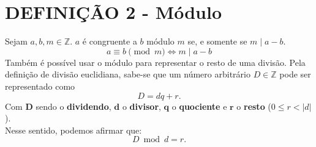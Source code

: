 \section*{DEFINIÇÃO 2 - Módulo}
Sejam $a, b, m \in \mathbb{Z}$. $a$ é congruente a $b$ módulo $m$ se, e somente se $m \mid a-b$.
\[
    a \equiv b \pmod m \iff m \mid a-b
\]
Também é possível usar o módulo para representar o resto de uma divisão. Pela definição de divisão euclidiana, sabe-se que um número arbitrário $D \in \mathbb{Z}$ pode ser representado como
\[
    D = dq+r\text{.}
\]
Com $\mathbf{D}$ sendo o \textbf{dividendo}, $\mathbf{d}$ o \textbf{divisor}, $\mathbf{q}$ o \textbf{quociente} e $\mathbf{r}$ o \textbf{resto} ($0 \leq r < |d|$).\\
Nesse sentido, podemos afirmar que:
\[
    D \bmod d = r\text{.}
\]